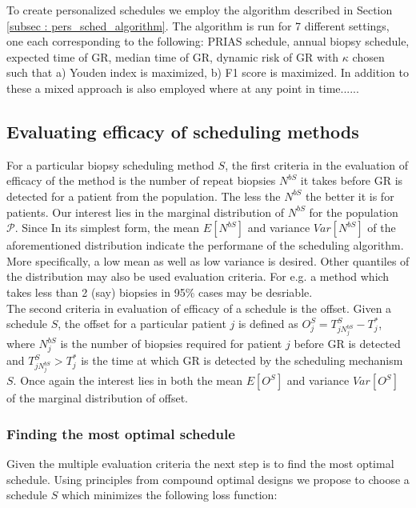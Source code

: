 To create personalized schedules we employ the algorithm described in Section \ref{subsec : pers_sched_algorithm}. The algorithm is run for 7 different settings, one each corresponding to the following: PRIAS schedule, annual biopsy schedule, expected time of GR, median time of GR, dynamic risk of GR with $\kappa$ chosen such that a) Youden index is maximized, b) F1 score is maximized. In addition to these a mixed approach is also employed where at any point in time......

\subsection{Evaluating efficacy of scheduling methods}
For a particular biopsy scheduling method $S$, the first criteria in the evaluation of efficacy of the method is the number of repeat biopsies $N^{bS}$ it takes before GR is detected for a patient from the population. The less the $N^{bS}$ the better it is for patients. Our interest lies in the marginal distribution of $N^{bS}$ for the population $\mathcal{P}$. Since In its simplest form, the mean $E[N^{bS}]$ and variance $Var[N^{bS}]$ of the aforementioned distribution indicate the performane of the scheduling algorithm. More specifically, a low mean as well as low variance is desired. Other quantiles of the distribution may also be used evaluation criteria. For e.g. a method which takes less than 2 (say) biopsies in 95\% cases may be desriable.\\

The second criteria in evaluation of efficacy of a schedule is the offset. Given a schedule $S$, the offset for a particular patient $j$ is defined as $O^S_j = T^S_{j{N^{bS}_j}} - T^*_j$, where $N^{bS}_j$ is the number of biopsies required for patient $j$ before GR is detected and $T^S_{j{N^{bS}_j}} > T^*_j$ is the time at which GR is detected by the scheduling mechanism $S$. Once again the interest lies in both the mean $E[O^S]$ and variance $Var[O^S]$ of the marginal distribution of offset.

\subsubsection{Finding the most optimal schedule}
Given the multiple evaluation criteria the next step is to find the most optimal schedule. Using principles from compound optimal designs \citep{lauter1976optimal} we propose to choose a schedule $S$ which minimizes the following loss function:

